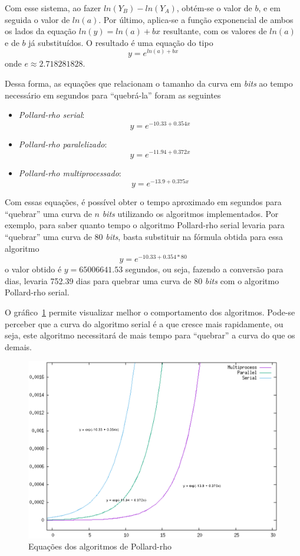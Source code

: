 Com esse sistema, ao fazer \(ln(Y_B) - ln(Y_A)\), obtém-se o valor de \(b\), e em seguida o valor de \(ln(a)\). Por último, aplica-se a função exponencial de ambos os lados da equação \(ln(y) = ln(a) + bx\) resultante, com os valores de \(ln(a)\) e de \(b\) já substituídos. O resultado é uma equação do tipo
$$
	y = e^{ln(a) + bx}
$$
onde \(e \approx 2.718281828\).

Dessa forma, as equações que relacionam o tamanho da curva em \textit{bits} ao tempo necessário em segundos para ``quebrá-la'' foram as seguintes
\begin{itemize}
	\item \textit{Pollard-rho serial}: $$y = e^{-10.33 + 0.354x}$$
	\item \textit{Pollard-rho paralelizado}: $$y = e^{-11.94 + 0.372x}$$
	\item \textit{Pollard-rho multiprocessado}: $$y = e^{-13.9 + 0.375x}$$
\end{itemize}

Com essas equações, é possível obter o tempo aproximado em segundos para ``quebrar'' uma curva de \(n\) \textit{bits} utilizando os algoritmos implementados. Por exemplo, para saber quanto tempo o algoritmo Pollard-rho serial levaria para ``quebrar'' uma curva de 80 \textit{bits}, basta substituir na fórmula obtida para essa algoritmo
$$
	y = e^{-10.33 + 0.354*80}
$$
o valor obtido é \(y = 65006641.53\) segundos, ou seja, fazendo a conversão para dias, levaria 752.39 dias para quebrar uma curva de 80 \textit{bits} com o algoritmo Pollard-rho serial.

O gráfico~\ref{eq_graph} permite visualizar melhor o comportamento dos algoritmos. Pode-se perceber que a curva do algoritmo serial é a que cresce mais rapidamente, ou seja, este algoritmo necessitará de mais tempo para ``quebrar'' a curva do que os demais.

\begin{figure}
\centering
\includegraphics[scale=0.6, bb=0 0 515 478]{figuras/pollard_formulas.eps}
\caption{Equações dos algoritmos de Pollard-rho}
\label{eq_graph}
\end{figure}

